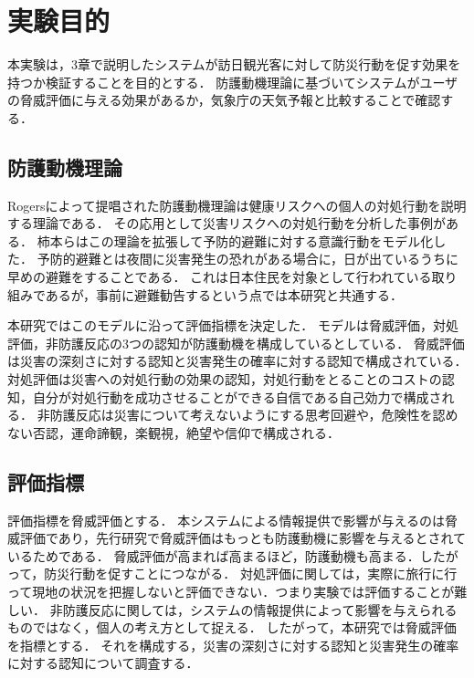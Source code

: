\section{実験目的}
本実験は，3章で説明したシステムが訪日観光客に対して防災行動を促す効果を持つか検証することを目的とする．
防護動機理論に基づいてシステムがユーザの脅威評価に与える効果があるか，気象庁の天気予報と比較することで確認する．

\subsection{防護動機理論}
Rogersによって提唱された防護動機理論\cite{1360292618739561728,1570572700020740224}は健康リスクへの個人の対処行動を説明する理論である．
その応用として災害リスクへの対処行動を分析した事例がある．
柿本ら\cite{Kakimoto2014}はこの理論を拡張して予防的避難に対する意識行動をモデル化した．
予防的避難とは夜間に災害発生の恐れがある場合に，日が出ているうちに早めの避難をすることである．
これは日本住民を対象として行われている取り組みであるが，事前に避難勧告するという点では本研究と共通する．\par
本研究ではこのモデルに沿って評価指標を決定した．
モデルは脅威評価，対処評価，非防護反応の3つの認知が防護動機を構成しているとしている．
脅威評価は災害の深刻さに対する認知と災害発生の確率に対する認知で構成されている．
対処評価は災害への対処行動の効果の認知，対処行動をとることのコストの認知，自分が対処行動を成功させることができる自信である自己効力で構成される．
非防護反応は災害について考えないようにする思考回避や，危険性を認めない否認，運命諦観，楽観視，絶望や信仰で構成される．

\subsection{評価指標}
評価指標を脅威評価とする．
本システムによる情報提供で影響が与えるのは脅威評価であり，先行研究で脅威評価はもっとも防護動機に影響を与えるとされているためである．
脅威評価が高まれば高まるほど，防護動機も高まる．したがって，防災行動を促すことにつながる．
対処評価に関しては，実際に旅行に行って現地の状況を把握しないと評価できない．つまり実験では評価することが難しい．
非防護反応に関しては，システムの情報提供によって影響を与えられるものではなく，個人の考え方として捉える．
したがって，本研究では脅威評価を指標とする．
それを構成する，災害の深刻さに対する認知と災害発生の確率に対する認知について調査する．

